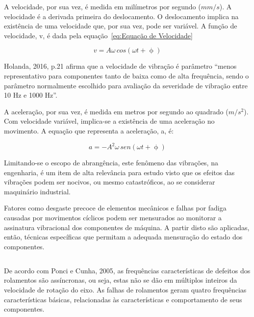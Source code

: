 \documentclass[
	12pt,				
	oneside,			
	a4paper,			
	english,			
	brazil,			
	]{abntex2ppgsi}
\begin{document}
A velocidade, por sua vez, é medida em milímetros por segundo ($mm/s$). A velocidade é a derivada primeira do deslocamento. O deslocamento implica na existência de uma velocidade que, por sua vez, pode ser variável. A função de velocidade, v, é dada pela equação~\ref{eq:Equação de Velocidade}

\begin{equation}
	v = A\omega \,cos (\omega t + \upphi)
	\label{eq:Equação de Velocidade}
\end{equation}

Holanda, 2016, p.21 afirma que a velocidade de vibração é parâmetro “menos representativo para componentes tanto de baixa como de alta frequência, sendo o parâmetro normalmente escolhido para avaliação da severidade de vibração entre 10 Hz e 1000 Hz”.

A aceleração, por sua vez, é medida em metros por segundo ao quadrado ($m/s^{2}$). Com velocidade variável, implica-se a existência de uma aceleração no movimento. A equação que representa a aceleração, a, é:

\begin{equation}
	a = -A^{2} \omega \,sen (\omega t + \upphi)
	\label{eq: Equação de Aceleração}
\end{equation}

Limitando-se o escopo de abrangência, este fenômeno das vibrações, na engenharia, é um item de alta relevância para estudo visto que os efeitos das vibrações podem ser nocivos, ou mesmo catastróficos, ao se considerar maquinário industrial. 

Fatores como desgaste precoce de elementos mecânicos e falhas por fadiga causadas por movimentos cíclicos podem ser mensurados ao monitorar a assinatura vibracional dos componentes de máquina. A partir disto são aplicadas, então, técnicas específicas que permitam a adequada mensuração do estado dos componentes. 

\subsection{}

De acordo com Ponci e Cunha, 2005, as frequências características de defeitos dos rolamentos são assíncronas, ou seja, estas não se dão em múltiplos inteiros da velocidade de rotação do eixo. As falhas de rolamentos geram quatro frequências características básicas, relacionadas às características e comportamento de seus componentes. 
\end{document}
